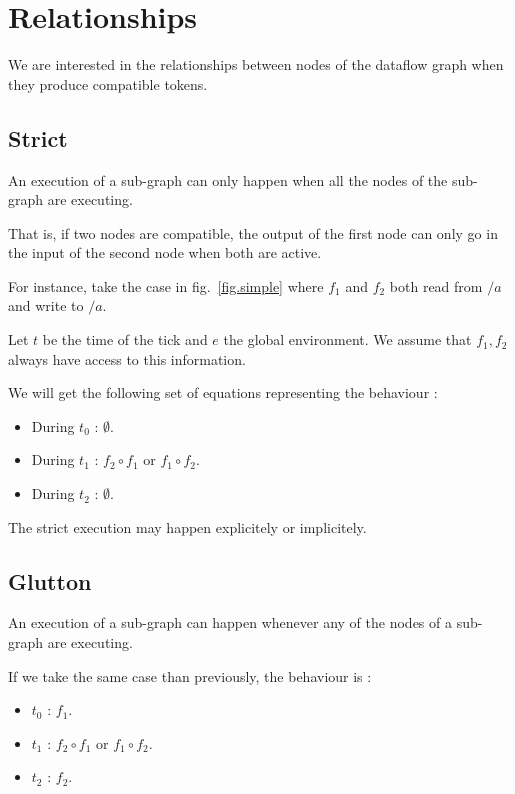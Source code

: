 \documentclass{article}
\begin{document}
	
    
	\section{Relationships}
    We are interested in the relationships between nodes of the dataflow graph when they produce compatible tokens.
     
    \subsection{Strict}
    An execution of a sub-graph can only happen when all the nodes of the sub-graph are executing.
    
    That is, if two nodes are compatible, the output of the first node can only go in the input of the second node when both are active.
    
    For instance, take the case in fig.~\ref{fig.simple} where $f_1$ and $f_2$ both read from $/a$ and write to $/a$.
    
    Let $t$ be the time of the tick and $e$ the global environment. We assume that $f_1, f_2$ always have access to this information.
    
    We will get the following set of equations representing the behaviour : 
    \begin{itemize}
        \item During $t_0$ : $\emptyset$.
        \item During $t_1$ : $f_2 \circ f_1 $ or $f_1 \circ f_2$.
        \item During $t_2$ : $\emptyset$. 
    \end{itemize}

    The strict execution may happen explicitely or implicitely.
    
	\subsection{Glutton}
	An execution of a sub-graph can happen whenever any of the nodes of a sub-graph are executing. 
    
    If we take the same case than previously, the behaviour is :
    \begin{itemize}
        \item $t_0$ : $f_1$.
        \item $t_1$ : $f_2 \circ f_1$ or $f_1 \circ f_2$.
        \item $t_2$ : $f_2$. 
    \end{itemize}
\end{document}
